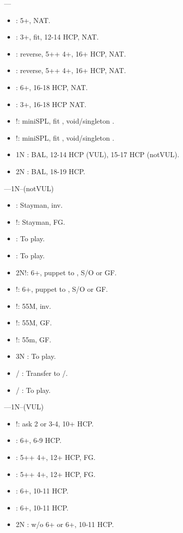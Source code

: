 \documentclass[12pt,twoside,a5paper]{report}%
\begin{document}
	----
	\begin{itemize}
	\renewcommand{\labelitemi}{}
	\item {} : 5+\cl{}, NAT.
	\item {} : 3+\di{}, fit, 12-14 HCP, NAT.
	\item {} : reverse, 5+\cl{}+ 4+\he{}, 16+ HCP, NAT.
	\item {} : reverse, 5+\cl{}+ 4+\sp{}, 16+ HCP, NAT.
	\item {} : 6+\cl{}, 16-18 HCP, NAT.
	\item {} : 3+\di{}, 16-18 HCP NAT.
	\item {}!: miniSPL, fit \di{}, void/singleton \he{}.
	\item {}!: miniSPL, fit \di{}, void/singleton \sp{}.
	\item 1N : BAL, 12-14 HCP (VUL), 15-17 HCP (notVUL).
	\item 2N : BAL, 18-19 HCP.
	\end{itemize}

	----1N--(notVUL)
	\begin{itemize}
	\renewcommand{\labelitemi}{}
	\item {} : Stayman, inv.
	\item {}!: Stayman, FG.
	\item {} : To play.
	\item {} : To play.
	\item 2N!: 6+\cl{}, puppet to , S/O or GF.
	\item {}!: 6+\di{}, puppet to , S/O or GF.
	\item {}!: 55M, inv.
	\item {}!: 55M, GF.
	\item {}!: 55m, GF.
	\item 3N : To play.
	\item {}/\di{} : Transfer to /\sp{}.
	\item {}/\sp{} : To play.
	\end{itemize}

	----1N--(VUL)
	\begin{itemize}
	\renewcommand{\labelitemi}{}
	\item {}!: ask 2\di{} or 3-4\cl{}, 10+ HCP.
	\item {} : 6+\di{}, 6-9 HCP.
	\item {} : 5+\di{}+ 4+\he{}, 12+ HCP, FG.
	\item {} : 5+\di{}+ 4+\sp{}, 12+ HCP, FG.
	\item {} : 6+\cl{}, 10-11 HCP.
	\item {} : 6+\di{}, 10-11 HCP.
	\item 2N : w/o 6+\cl{} or 6+\di{}, 10-11 HCP.
	\end{itemize}
\end{document}
